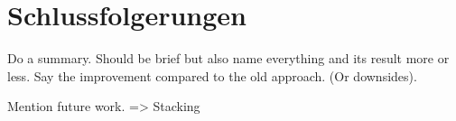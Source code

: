 \chapter{Schlussfolgerungen}
Do a summary. Should be brief but also name everything and its result more or less.
Say the improvement compared to the old approach. (Or downsides).

Mention future work. => Stacking